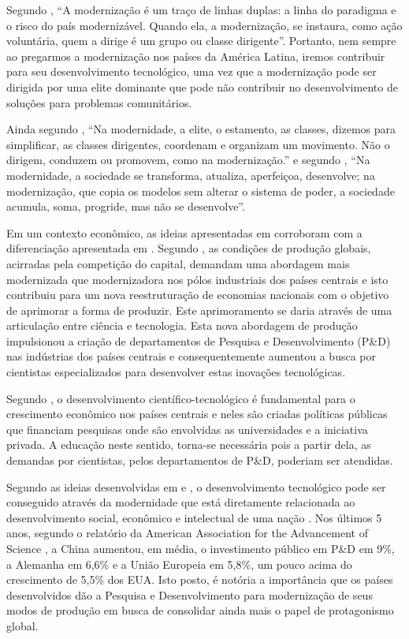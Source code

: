 Segundo \cite{faoro1992questao}, ``A modernização é um traço de linhas duplas: a linha do paradigma e o risco do país modernizável. Quando ela, a modernização, se instaura, como ação voluntária, quem a dirige é um grupo ou classe dirigente''. Portanto, nem sempre ao pregarmos a modernização nos países da América Latina, iremos contribuir para seu desenvolvimento tecnológico, uma vez que a modernização pode ser dirigida por uma elite dominante que pode não contribuir no desenvolvimento de soluções para problemas comunitários.

Ainda segundo \cite{faoro1992questao}, ``Na modernidade, a elite, o estamento, as classes, dizemos para simplificar, as classes dirigentes, coordenam e organizam um movimento. Não o dirigem, conduzem ou promovem, como na modernização.'' e segundo \cite{lima2009politica}, ``Na modernidade, a sociedade se transforma, atualiza, aperfeiçoa, desenvolve; na modernização, que copia os modelos sem alterar o sistema de poder, a sociedade acumula, soma, progride, mas não se desenvolve''.

Em um contexto econômico, as ideias apresentadas em \cite{dupas2001economia} corroboram com a diferenciação apresentada em \cite{faoro1992questao}. Segundo \cite{dupas2001economia}, as condições de produção globais, acirradas pela competição do capital, demandam uma abordagem mais modernizada que modernizadora nos pólos industriais dos países centrais e isto contribuiu para um nova reestruturação de economias nacionais com o objetivo de aprimorar a forma de produzir. Este aprimoramento se daria através de uma articulação entre ciência e tecnologia. Esta nova abordagem de produção impulsionou a criação de departamentos de Pesquisa e Desenvolvimento (P\&D) nas indústrias dos países centrais e consequentemente aumentou a busca por cientistas especializados para desenvolver estas inovações tecnológicas.

Segundo \cite{lima2009politica}, o desenvolvimento científico-tecnológico é fundamental para o crescimento econômico nos países centrais e neles são criadas políticas públicas que financiam pesquisas onde são envolvidas as universidades e a iniciativa privada. A educação neste sentido, torna-se necessária pois a partir dela, as demandas por cientistas, pelos departamentos de P\&D, poderiam ser atendidas.

Segundo as ideias desenvolvidas em \cite{faoro1992questao} e \cite{lima2009politica}, o desenvolvimento tecnológico pode ser conseguido através da modernidade que está diretamente relacionada ao desenvolvimento social, econômico e intelectual de uma nação \cite{lima2009politica}. Nos últimos 5 anos, segundo o relatório da American Association for the Advancement of Science \cite{american2021}, a China aumentou, em média, o investimento público em P\&D em 9\%, a Alemanha em 6,6\% e a União Europeia em 5,8\%, um pouco acima do crescimento de 5,5\% dos EUA. Isto posto, é notória a importância que os países desenvolvidos dão a Pesquisa e Desenvolvimento para modernização de seus modos de produção em busca de consolidar ainda mais o papel de protagonismo global.

